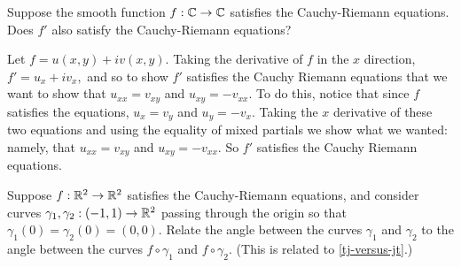 \documentclass{homework}
\begin{document}
                                           \begin{problem}\label{cauchy-riemann-again}
                                             Suppose the smooth function $f : \mathbb{C} \to \mathbb{C}$ satisfies the
                                               Cauchy-Riemann equations.  Does $f'$ also satisfy the Cauchy-Riemann
                                                 equations?
                                                 \end{problem}
                                                 \begin{solution}
                                                 Let $f = u(x,y) + iv(x,y).$ 
                                                 Taking the derivative of $f$ in the $x$ direction, $f' = u_x + iv_x,$ and so to show $f'$ satisfies the Cauchy Riemann equations that we want to show that $u_{xx}=v_{xy}$ and $u_{xy} = -v_{xx}.$ To do this, notice that since $f$ satisfies the equations, $u_{x} = v_y$ and $u_y=-v_x$. Taking the $x$ derivative of these two equations and using the equality of mixed partials we show what we wanted: namely, that $u_{xx}=v_{xy}$ and $u_{xy} = -v_{xx}.$ So $f'$ satisfies the Cauchy Riemann equations.
                                                 \end{solution}
                                                 \begin{problem}
                                                   Suppose $f : \mathbb{R}^2 \to \mathbb{R}^2$ satisfies the Cauchy-Riemann equations,
                                                     and consider curves $\gamma_1, \gamma_2 : (-1,1) \to \mathbb{R}^2$ passing
                                                       through the origin so that $\gamma_1(0) = \gamma_2(0) = (0,0)$.
                                                         Relate the angle between the curves $\gamma_1$ and $\gamma_2$ to the
                                                           angle between the curves $f \circ \gamma_1$ and $f \circ \gamma_2$.
                                                             (This is related to \ref{tj-versus-jt}.)
                                                             \end{problem}
\end{document}
